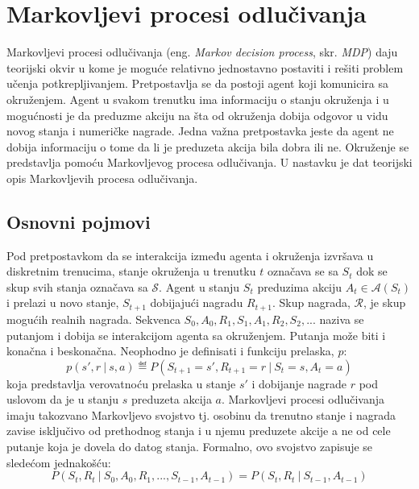 \chapter{Markovljevi procesi odlučivanja}
\label{ch:mdp}

Markovljevi procesi odlučivanja (eng. {\em Markov decision process}, skr. {\em MDP}) daju teorijski okvir u kome je moguće relativno jednostavno postaviti i rešiti problem učenja potkrepljivanjem. Pretpostavlja se da postoji agent koji komunicira sa okruženjem. Agent u svakom trenutku ima informaciju o stanju okruženja i u mogućnosti je da preduzme akciju na šta od okruženja dobija odgovor u vidu novog stanja i numeričke nagrade. Jedna važna pretpostavka jeste da agent ne dobija informaciju o tome da li je preduzeta akcija bila dobra ili ne. Okruženje se predstavlja pomoću Markovljevog procesa odlučivanja. U nastavku je dat teorijski opis Markovljevih procesa odlučivanja.

\section{Osnovni pojmovi}
Pod pretpostavkom da se interakcija između agenta i okruženja izvršava u diskretnim trenucima, stanje okruženja u trenutku $t$ označava se sa $S_t$ dok se skup svih stanja označava sa $\mathcal{S}$.  Agent u stanju $S_t$ preduzima akciju $A_t \in \mathcal{A}(S_t)$ i prelazi u novo stanje, $S_{t+1}$ dobijajući nagradu $R_{t+1}$. Skup nagrada,  $\mathcal{R}$, je skup mogućih realnih nagrada. Sekvenca $S_0, A_0, R_1, S_1, A_1, R_2, S_2, ...$ naziva se putanjom i dobija se interakcijom agenta sa okruženjem. Putanja može biti i konačna i beskonačna.
Neophodno je definisati i funkciju prelaska, $p$:
\begin{equation}
	p(s', r ~|~ s, a) \eqdef P(S_{t+1} = s', R_{t+1} = r ~|~ S_t = s, A_t = a)
\end{equation}
koja predstavlja verovatnoću prelaska u stanje $s'$ i dobijanje nagrade $r$ pod uslovom da je u stanju $s$ preduzeta akcija $a$. Markovljevi procesi odlučivanja imaju takozvano Markovljevo svojstvo tj. osobinu da trenutno stanje i nagrada zavise isključivo od prethodnog stanja i u njemu preduzete akcije a ne od cele putanje koja je dovela do datog stanja. Formalno, ovo svojstvo zapisuje se sledećom jednakošću:
\begin{equation}
	P(S_t, R_t ~|~ S_0, A_0, R_1, ..., S_{t-1}, A_{t-1}) = P(S_t, R_t ~|~ S_{t-1}, A_{t-1})
\end{equation}

